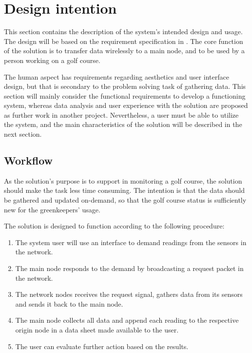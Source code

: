 \section{Design intention}
This section contains the description of the system's intended design and usage. The design will be based on the requirement specification in . The core function of the solution is to transfer data wirelessly to a main node, and to be used by a person working on a golf course. 

The human aspect has requirements regarding aesthetics and user interface design, but that is secondary to the problem solving task of gathering data. This section will mainly consider the functional requirements to develop a functioning system, whereas data analysis and user experience with the solution are proposed as further work in another project. Nevertheless, a user must be able to utilize the system, and the main characteristics of the solution will be described in the next section.

\subsection{Workflow}\label{cha:workflowDesign}
As the solution's purpose is to support in monitoring a golf course, the solution should make the task less time consuming. The intention is that the data should be gathered and updated on-demand, so that the golf course status is sufficiently new for the greenkeepers' usage.

The solution is designed to function according to the following procedure:
\begin{enumerate}
	\item The system user will use an interface to demand readings from the sensors in the network.
	\item The main node responds to the demand by broadcasting a request packet in the network.
	\item The network nodes receives the request signal, gathers data from its sensors and sends it back to the main node.
	\item The main node collects all data and append each reading to the respective origin node in a data sheet made available to the user.
	\item The user can evaluate further action based on the results.
\end{enumerate}

